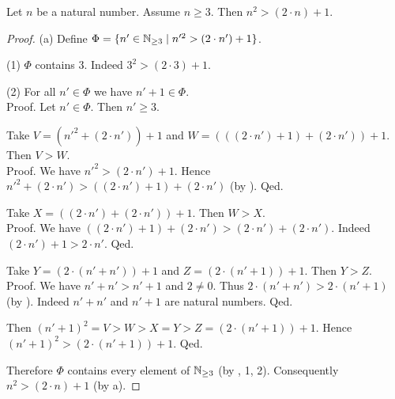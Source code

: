 \documentclass[10pt]{article}
\begin{document}
  \begin{forthel}
    \begin{proposition}[id=ARITHMETIC_09_134060414337024,printid]
      Let $n$ be a natural number.
      Assume $n \geq 3$.
      Then $n^{2} > (2 \cdot n) + 1$.
    \end{proposition}
    \begin{proof}
      (a) Define $\Phi = \{ n' \in \mathbb{N}_{\geq 3} \mid n'^{2} > (2 \cdot n') + 1 \}$.

      (1) $\Phi$ contains $3$.
      Indeed $3^{2} > (2 \cdot 3) + 1$.

      (2) For all $n' \in \Phi$ we have $n' + 1 \in \Phi$. \\
      Proof.
        Let $n' \in \Phi$.
        Then $n' \geq 3$.

        Take $V = (n'^{2} + (2 \cdot n')) + 1$ and $W = (((2 \cdot n') + 1) + (2 \cdot n')) + 1$.
        Then $V > W$. \\
        Proof.
          We have $n'^{2} > (2 \cdot n') + 1$.
          Hence $n'^{2} + (2 \cdot n') > ((2 \cdot n') + 1) + (2 \cdot n')$ (by ).
        Qed.

        Take $X = ((2 \cdot n') + (2 \cdot n')) + 1$.
        Then $W > X$. \\
        Proof.
          We have $((2 \cdot n') + 1) + (2 \cdot n') > (2 \cdot n') + (2 \cdot n')$.
          Indeed $(2 \cdot n') + 1 > 2 \cdot n'$.
        Qed.

        Take $Y = (2 \cdot (n' + n')) + 1$ and $Z = (2 \cdot (n' + 1)) + 1$.
        Then $Y > Z$. \\
        Proof.
          We have $n' + n' > n' + 1$ and $2 \neq 0$.
          Thus $2 \cdot (n' + n') > 2 \cdot (n' + 1)$ (by ).
          Indeed $n' + n'$ and $n' + 1$ are natural numbers.
        Qed.

        Then $(n' + 1)^{2} = V > W > X = Y > Z = (2 \cdot (n' + 1)) + 1$.
        Hence $(n' + 1)^{2} > (2 \cdot (n' + 1)) + 1$.
      Qed.

      Therefore $\Phi$ contains every element of $\mathbb{N}_{\geq 3}$ (by , 1, 2).
      Consequently $n^{2} > (2 \cdot n) + 1$ (by a).
    \end{proof}
  \end{forthel}
\end{document}

